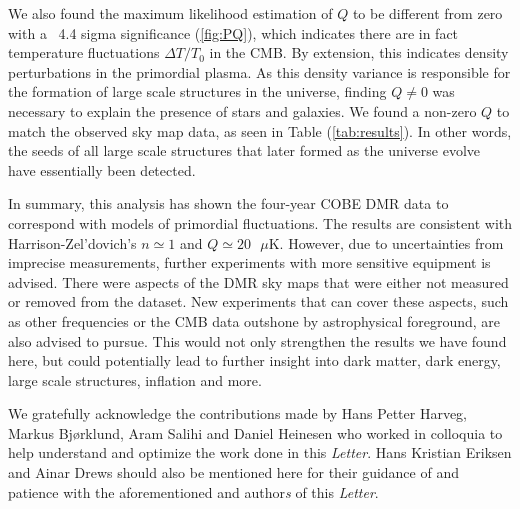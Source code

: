 \documentclass{emulateapj}
\begin{document}
We also found the maximum likelihood estimation of $Q$ to be different from zero with a ~4.4 sigma significance (\ref{fig:PQ}), which indicates there are in fact temperature fluctuations $\Delta T / T_0$ in the CMB. By extension, this indicates density perturbations in the primordial plasma. As this density variance is responsible for the formation of large scale structures in the universe, finding $Q \neq 0$ was necessary to explain the presence of stars and galaxies. We found a non-zero $Q$ to match the observed sky map data, as seen in Table (\ref{tab:results}). In other words, the seeds of all large scale structures that later formed as the universe evolve have essentially been detected.  


In summary, this analysis has shown the four-year COBE DMR data to correspond with models of primordial fluctuations. The results are consistent with Harrison-Zel'dovich's $n \simeq 1$ and $Q \simeq 20 \text{ }\mu$K. However, due to uncertainties from imprecise measurements, further experiments with more sensitive equipment is advised. There were aspects of the DMR sky maps that were either not measured or removed from the dataset. New experiments that can cover these aspects, such as other frequencies or the CMB data outshone by astrophysical foreground, are also advised to pursue. This would not only strengthen the results we have found here, but could potentially lead to further insight into dark matter, dark energy, large scale structures, inflation and more.




\begin{acknowledgements}
  We gratefully acknowledge the contributions made by Hans Petter Harveg, Markus Bjørklund, Aram Salihi and Daniel Heinesen who worked in colloquia to help understand and optimize the work done in this \textit{Letter}. Hans Kristian Eriksen and Ainar Drews should also be mentioned here for their guidance of and patience with the aforementioned and author\textit{s} of this \textit{Letter}.
\end{acknowledgements}
\end{document}
